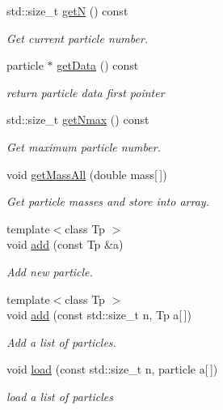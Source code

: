 \begin{DoxyCompactItemize}
std\+::size\+\_\+t \hyperlink{classARC_1_1chainlist_a4292d4468e5d710392f11cee0c1f01b9}{getN} () const
\begin{DoxyCompactList}\small\item\em Get current particle number. \end{DoxyCompactList}\item 
particle $\ast$ \hyperlink{classARC_1_1chainlist_a0e19bd06e5aa685e88948c947cd06552}{get\+Data} () const
\begin{DoxyCompactList}\small\item\em return particle data first pointer \end{DoxyCompactList}\item 
std\+::size\+\_\+t \hyperlink{classARC_1_1chainlist_a582f94629e7433bab30f7ab5e4ef588f}{get\+Nmax} () const
\begin{DoxyCompactList}\small\item\em Get maximum particle number. \end{DoxyCompactList}\item 
void \hyperlink{classARC_1_1chainlist_a85bba1921256d2a1a6784006927ad397}{get\+Mass\+All} (double mass\mbox{[}$\,$\mbox{]})
\begin{DoxyCompactList}\small\item\em Get particle masses and store into array. \end{DoxyCompactList}\item 
{\footnotesize template$<$class Tp $>$ }\\void \hyperlink{classARC_1_1chainlist_a598c1819d8e715ec0a24669e5bb06c6a}{add} (const Tp \&a)
\begin{DoxyCompactList}\small\item\em Add new particle. \end{DoxyCompactList}\item 
{\footnotesize template$<$class Tp $>$ }\\void \hyperlink{classARC_1_1chainlist_a1d73020beb10702237c27745c3ba851f}{add} (const std\+::size\+\_\+t n, Tp a\mbox{[}$\,$\mbox{]})
\begin{DoxyCompactList}\small\item\em Add a list of particles. \end{DoxyCompactList}\item 
void \hyperlink{classARC_1_1chainlist_aa767ec18c7ed7372a1ef1a4b27a171c3}{load} (const std\+::size\+\_\+t n, particle a\mbox{[}$\,$\mbox{]})
\begin{DoxyCompactList}\small\item\em load a list of particles \end{DoxyCompactList}\item 

\end{DoxyCompactItemize}
